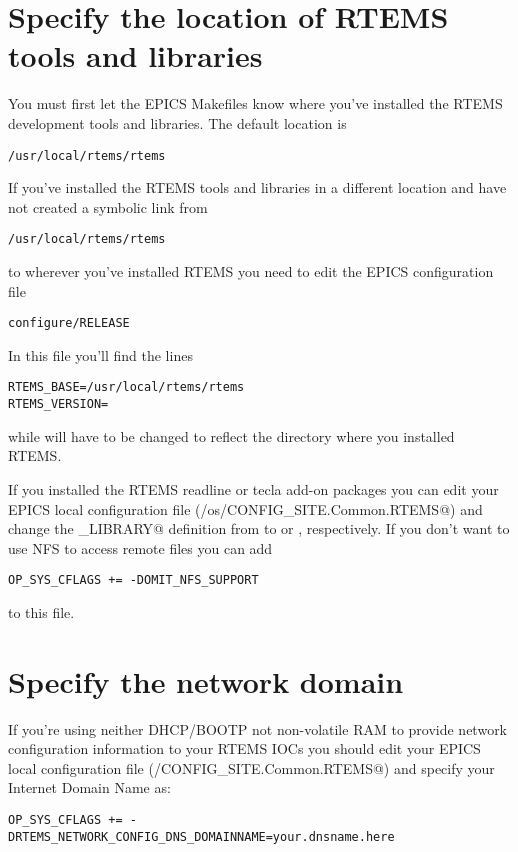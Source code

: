 \documentclass{report}
\begin{document}
\section{Specify the location of RTEMS tools and libraries}
You must first let the EPICS Makefiles know where you've installed
the RTEMS development tools and libraries.  The default location is
\begin{alltt}
/usr/local/rtems/rtems\rtemsToolVersion
\end{alltt}
If you've installed the RTEMS tools and libraries in a different location and
have not created a symbolic link from
\begin{alltt}
/usr/local/rtems/rtems\rtemsToolVersion
\end{alltt}
to wherever you've installed RTEMS you need to edit the EPICS configuration
file
\begin{verbatim}
configure/RELEASE
\end{verbatim}
In this file you'll find the lines
\begin{alltt}
RTEMS_BASE=/usr/local/rtems/rtems\rtemsToolVersion
RTEMS_VERSION=\rtemsToolVersion
\end{alltt}
while will have to be changed to reflect the directory where you installed RTEMS.

If you installed the RTEMS readline or tecla add-on packages you can edit
your EPICS local configuration file (\verb@configure/os/CONFIG_SITE.Common.RTEMS@)
and change the \verb@EPICSCOMMANDLINE_LIBRARY@ definition from \verb@EPICS@ to
\verb@READLINE@ or \verb@LIBTECLA@, respectively.
If you don't want to use NFS to access remote files you can add
\begin{verbatim}
OP_SYS_CFLAGS += -DOMIT_NFS_SUPPORT
\end{verbatim}
to this file.

\section{Specify the network domain}
If you're using neither DHCP/BOOTP not non-volatile RAM to provide network
configuration information to your RTEMS IOCs you should edit
your EPICS local configuration file (\verb@configure/CONFIG_SITE.Common.RTEMS@)
and specify your Internet Domain Name as:
\begin{verbatim}
OP_SYS_CFLAGS += -DRTEMS_NETWORK_CONFIG_DNS_DOMAINNAME=your.dnsname.here
\end{verbatim}
\end{document}
